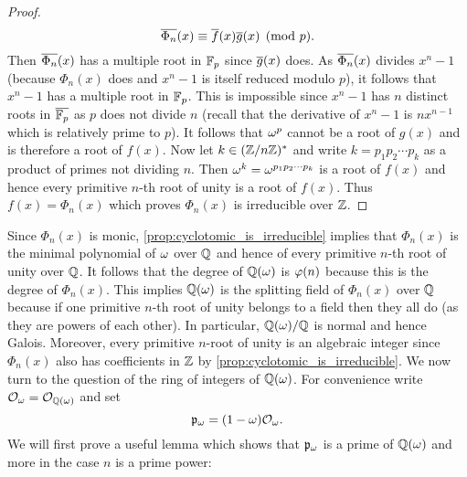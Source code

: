 \begin{proof}
      \[
        \overline{\Phi_{n}}(x) \equiv \overline{f}(x)\overline{g}(x) \pmod{p}.
      \]
      Then $\overline{\Phi_{n}}(x)$ has a multiple root in $\mathbb{F}_{p}$ since $\overline{g}(x)$ does. As $\overline{\Phi_{n}}(x)$ divides $x^{n}-1$ (because $\Phi_{n}(x)$ does and $x^{n}-1$ is itself reduced modulo $p$), it follows that $x^{n}-1$ has a multiple root in $\mathbb{F}_{p}$. This is impossible since $x^{n}-1$ has $n$ distinct roots in $\overline{\mathbb{F}_{p}}$ as $p$ does not divide $n$ (recall that the derivative of $x^{n}-1$ is $nx^{n-1}$ which is relatively prime to $p$). It follows that $\omega^{p}$ cannot be a root of $g(x)$ and is therefore a root of $f(x)$. Now let $k \in (\mathbb{Z}/n\mathbb{Z})^{\ast}$ and write $k = p_{1}p_{2} \cdots p_{k}$ as a product of primes not dividing $n$. Then $\omega^{k} = \omega^{p_{1}p_{2} \cdots p_{k}}$ is a root of $f(x)$ and hence every primitive $n$-th root of unity is a root of $f(x)$. Thus $f(x) = \Phi_{n}(x)$ which proves $\Phi_{n}(x)$ is irreducible over $\mathbb{Z}$.
    \end{proof}

    Since $\Phi_{n}(x)$ is monic, \cref{prop:cyclotomic_is_irreducible} implies that $\Phi_{n}(x)$ is the minimal polynomial of $\omega$ over $\mathbb{Q}$ and hence of every primitive $n$-th root of unity over $\mathbb{Q}$. It follows that the degree of $\mathbb{Q}(\omega)$ is $\varphi(n)$ because this is the degree of $\Phi_{n}(x)$. This implies $\mathbb{Q}(\omega)$ is the splitting field of $\Phi_{n}(x)$ over $\mathbb{Q}$ because if one primitive $n$-th root of unity belongs to a field then they all do (as they are powers of each other). In particular, $\mathbb{Q}(\omega)/\mathbb{Q}$ is normal and hence Galois. Moreover, every primitive $n$-root of unity is an algebraic integer since $\Phi_{n}(x)$ also has coefficients in $\mathbb{Z}$ by \cref{prop:cyclotomic_is_irreducible}. We now turn to the question of the ring of integers of $\mathbb{Q}(\omega)$. For convenience write $\mathcal{O}_{\omega} = \mathcal{O}_{\mathbb{Q}(\omega)}$ and set
    \[
      \mathfrak{p}_{\omega} = (1-\omega)\mathcal{O}_{\omega}.
    \]
    We will first prove a useful lemma which shows that $\mathfrak{p}_{\omega}$ is a prime of $\mathbb{Q}(\omega)$ and more in the case $n$ is a prime power:

